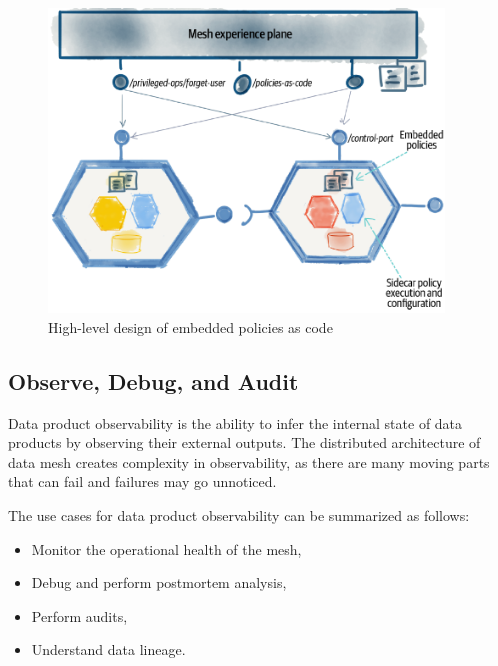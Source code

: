 \documentclass[12pt, a4paper]{book}
\begin{document}
\begin{figure}
	\begin{framed}
		\centering
		\includegraphics[width=10.5cm]{GovernData.png}
		\caption{High-level design of embedded policies as code}
		\label{GovernData}
	\end{framed}
\end{figure}

\subsection{Observe, Debug, and Audit}
Data product observability is the ability to infer the internal state of data products by observing their external outputs. The distributed architecture of data mesh creates complexity in observability, as there are many moving parts that can fail and failures may go unnoticed.

The use cases for data product observability can be summarized as follows:
	\begin{itemize}[nosep]
		\item Monitor the operational health of the mesh,
		\item Debug and perform postmortem analysis,
		\item Perform audits,
		\item Understand data lineage.
	\end{itemize}
\end{document}

